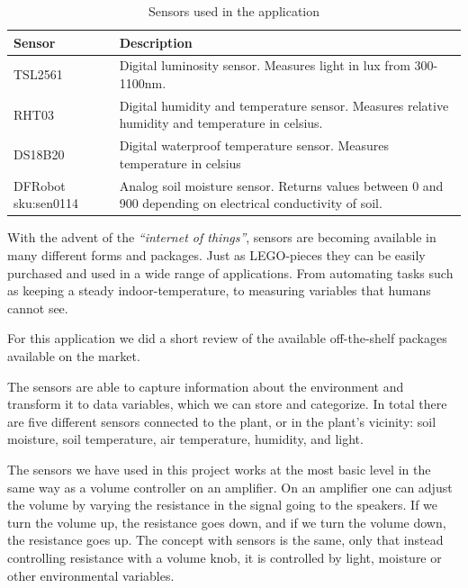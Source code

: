 \def\arraystretch{1.8}
\begin{table}
    \begin{tabular}{@{}lp{250pt}@{}}\toprule
    Sensor               & Description \\ \midrule                                                                                                  
    TSL2561              & Digital luminosity sensor. Measures light in lux from 300-1100nm.                                            \\ 
    RHT03                & Digital humidity and temperature sensor. Measures relative humidity and temperature in celsius.              \\ 
    DS18B20              & Digital waterproof temperature sensor. Measures temperature in celsius                                       \\ 
    DFRobot sku:sen0114  & Analog soil moisture sensor. Returns values between 0 and 900 depending on electrical conductivity of soil.  \\ \bottomrule
    \end{tabular}
    \caption{Sensors used in the application}
\end{table}


With the advent of the \emph{“internet of things”}, sensors are becoming available in many different forms and packages. Just as LEGO-pieces they can be easily purchased and used in a wide range of applications. From automating tasks such as keeping a steady indoor-temperature, to measuring variables that humans cannot see. 

For this application we did a short review of the available off-the-shelf packages available on the market. 

The sensors are able to capture information about the environment and transform it to data variables, which we can store and categorize. In total there are five different sensors connected to the plant, or in the plant’s vicinity: soil moisture, soil temperature, air temperature, humidity, and light. 



The sensors we have used in this project works at the most basic level in the same way as a volume controller on an amplifier. On an amplifier one can adjust the volume by varying the resistance in the signal going to the speakers. If we turn the volume up, the resistance goes down, and if we turn the volume down, the resistance goes up. The concept with sensors is the same, only that instead controlling resistance with a volume knob, it is controlled by light, moisture or other environmental variables. 


